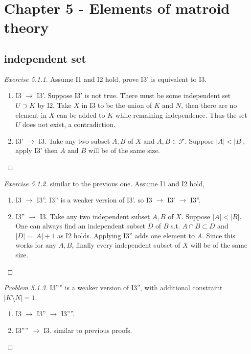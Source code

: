 \section{Chapter 5 - Elements of matroid theory}
\subsection{independent set}
\begin{proof}[Exercise 5.1.1]
    Assume I1 and I2 hold, prove I3' is equivalent to I3.
    \begin{enumerate}
        \item I3 $\to$ I3'. Suppose I3' is not true. There must be some independent set $U\supset K$ by I2. Take $X$ in I3 to be the union of $K$ and $N$, then there are no element in $X$ can be added to $K$ while remaining independence. Thus the set $U$ does not exist, a contradiction.
        \item I3' $\to$ I3. Take any two subset $A,B$ of $X$ and $A,B\in \mathcal F$. Suppose $|A|<|B|$, apply I3' then $A$ and $B$ will be of the same size.
    \end{enumerate}
\end{proof}
\begin{proof}[Exercise 5.1.2]
    similar to the previous one. Assume I1 and I2 hold,
    \begin{enumerate}
        \item I3 $\to$ I3''. I3'' is a weaker version of I3'. so I3 $\to$ I3' $\to$ I3''.
        \item I3'' $\to$ I3. Take any two independent subset $A,B$ of $X$. Suppose $|A|<|B|$. One can always find an independent subset $D$ of $B$ s.t. $A\cap B \subset D$ and $|D|=|A|+1$ as I2 holds. Applying I3'' adds one element to $A$. Since this works for any $A,B$, finally every independent subset of $X$ will be of the same size.
    \end{enumerate}
\end{proof}
\begin{proof}[Problem 5.1.3]
    I3'''' is a weaker version of I3'', with additional constraint $|K\setminus N|=1$.
    \begin{enumerate}
        \item I3 $\to$ I3'' $\to$ I3''''.
        \item I3'''' $\to$ I3. similar to previous proofs.
    \end{enumerate}
\end{proof}

